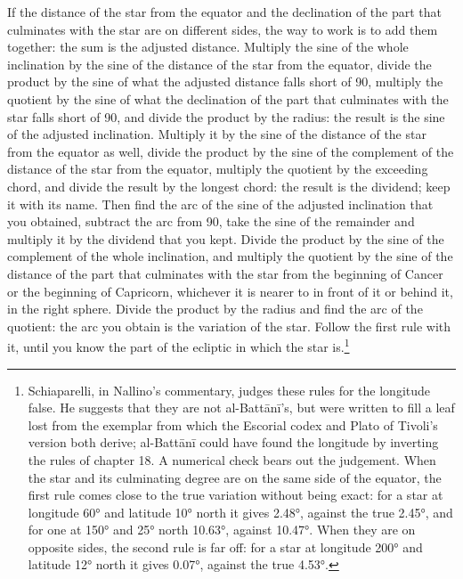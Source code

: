 \documentclass[11pt]{article}
\begin{document}
\par If the distance of the star from the equator and the declination of the part that culminates with the star are on different sides, the way to work is to add them together: the sum is the adjusted distance. Multiply the sine of the whole inclination by the sine of the distance of the star from the equator, divide the product by the sine of what the adjusted distance falls short of 90, multiply the quotient by the sine of what the declination of the part that culminates with the star falls short of 90, and divide the product by the radius: the result is the sine of the adjusted inclination. Multiply it by the sine of the distance of the star from the equator as well, divide the product by the sine of the complement of the distance of the star from the equator, multiply the quotient by the exceeding chord, and divide the result by the longest chord: the result is the dividend; keep it with its name. Then find the arc of the sine of the adjusted inclination that you obtained, subtract the arc from 90, take the sine of the remainder and multiply it by the dividend that you kept. Divide the product by the sine of the complement of the whole inclination, and multiply the quotient by the sine of the distance of the part that culminates with the star from the beginning of Cancer or the beginning of Capricorn, whichever it is nearer to in front of it or behind it, in the right sphere. Divide the product by the radius and find the arc of the quotient: the arc you obtain is the variation of the star. Follow the first rule with it, until you know the part of the ecliptic in which the star is.\footnote{Schiaparelli, in Nallino's commentary, judges these rules for the longitude false. He suggests that they are not al-Battānī's, but were written to fill a leaf lost from the exemplar from which the Escorial codex and Plato of Tivoli's version both derive; al-Battānī could have found the longitude by inverting the rules of chapter 18. A numerical check bears out the judgement. When the star and its culminating degree are on the same side of the equator, the first rule comes close to the true variation without being exact: for a star at longitude 60° and latitude 10° north it gives 2.48°, against the true 2.45°, and for one at 150° and 25° north 10.63°, against 10.47°. When they are on opposite sides, the second rule is far off: for a star at longitude 200° and latitude 12° north it gives 0.07°, against the true 4.53°.}\par
\end{document}
